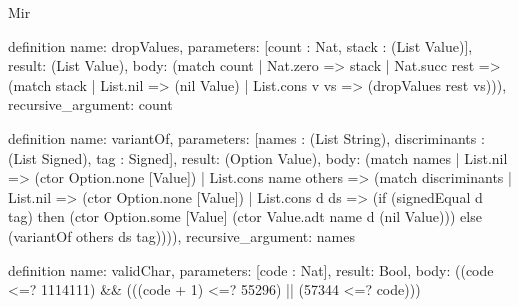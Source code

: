 \begin{lexlean}{Mir}
\begin{semanticmodule}
definition{
  name: dropValues,
  parameters: [count : Nat, stack : (List Value)],
  result: (List Value),
  body: (match count
    | Nat.zero => stack
    | Nat.succ rest => (match stack
      | List.nil => (nil Value)
      | List.cons v vs => (dropValues rest vs))),
  recursive_argument: count
}

definition{
  name: variantOf,
  parameters: [names : (List String), discriminants : (List Signed), tag : Signed],
  result: (Option Value),
  body: (match names
    | List.nil => (ctor Option.none [Value])
    | List.cons name others => (match discriminants
      | List.nil => (ctor Option.none [Value])
      | List.cons d ds => (if (signedEqual d tag) then (ctor Option.some [Value] (ctor Value.adt name d (nil Value))) else (variantOf others ds tag)))),
  recursive_argument: names
}

definition{
  name: validChar,
  parameters: [code : Nat],
  result: Bool,
  body: ((code <=? 1114111) && (((code + 1) <=? 55296) || (57344 <=? code)))
}


\end{semanticmodule}
\end{lexlean}
